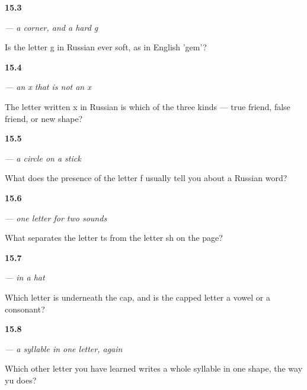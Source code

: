 \noindent\begin{minipage}[t]{\linewidth}
\raggedright
\hypertarget{review-RU-W07-g-sound}{\textbf{15.3}} \emph{ — a corner, and a hard g}\par
\small Is the letter g in Russian ever soft, as in English 'gem'?
\end{minipage}\par\medskip

\noindent\begin{minipage}[t]{\linewidth}
\raggedright
\hypertarget{review-RU-W07-kh-kind}{\textbf{15.4}} \emph{ — an x that is not an x}\par
\small The letter written x in Russian is which of the three kinds — true friend, false friend, or new shape?
\end{minipage}\par\medskip

\noindent\begin{minipage}[t]{\linewidth}
\raggedright
\hypertarget{review-RU-W07-f-borrowed}{\textbf{15.5}} \emph{ — a circle on a stick}\par
\small What does the presence of the letter f usually tell you about a Russian word?
\end{minipage}\par\medskip

\noindent\begin{minipage}[t]{\linewidth}
\raggedright
\hypertarget{review-RU-W07-ts-tail}{\textbf{15.6}} \emph{ — one letter for two sounds}\par
\small What separates the letter ts from the letter sh on the page?
\end{minipage}\par\medskip

\noindent\begin{minipage}[t]{\linewidth}
\raggedright
\hypertarget{review-RU-W07-y-short-base}{\textbf{15.7}} \emph{ —  in a hat}\par
\small Which letter is underneath the cap, and is the capped letter a vowel or a consonant?
\end{minipage}\par\medskip

\noindent\begin{minipage}[t]{\linewidth}
\raggedright
\hypertarget{review-RU-W07-yu-pattern}{\textbf{15.8}} \emph{ — a syllable in one letter, again}\par
\small Which other letter you have learned writes a whole syllable in one shape, the way yu does?
\end{minipage}\par\medskip

